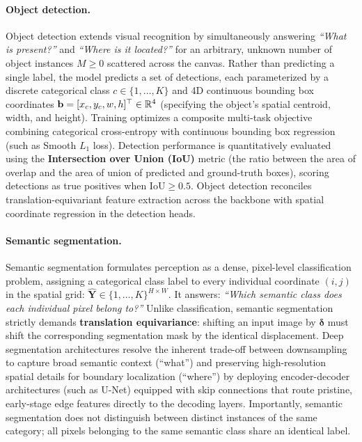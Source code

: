 \paragraph{Object detection.}
Object detection extends visual recognition by simultaneously answering \textit{``What is present?''} and \textit{``Where is it located?''} for an arbitrary, unknown number of object instances $M \ge 0$ scattered across the canvas. Rather than predicting a single label, the model predicts a set of detections, each parameterized by a discrete categorical class $c \in \{1, \dots, K\}$ and 4D continuous bounding box coordinates $\mathbf{b} = [x_c, y_c, w, h]^\top \in \mathbb{R}^4$ (specifying the object's spatial centroid, width, and height). Training optimizes a composite multi-task objective combining categorical cross-entropy with continuous bounding box regression (such as Smooth $L_1$ loss). Detection performance is quantitatively evaluated using the \textbf{Intersection over Union (IoU)} metric (the ratio between the area of overlap and the area of union of predicted and ground-truth boxes), scoring detections as true positives when $\text{IoU} \ge 0.5$. Object detection reconciles translation-equivariant feature extraction across the backbone with spatial coordinate regression in the detection heads.

\paragraph{Semantic segmentation.}
Semantic segmentation formulates perception as a dense, pixel-level classification problem, assigning a categorical class label to every individual coordinate $(i, j)$ in the spatial grid: $\hat{\mathbf{Y}} \in \{1, \dots, K\}^{H \times W}$. It answers: \textit{``Which semantic class does each individual pixel belong to?''} Unlike classification, semantic segmentation strictly demands \textbf{translation equivariance}: shifting an input image by $\boldsymbol{\delta}$ must shift the corresponding segmentation mask by the identical displacement. Deep segmentation architectures resolve the inherent trade-off between downsampling to capture broad semantic context (``what'') and preserving high-resolution spatial details for boundary localization (``where'') by deploying encoder-decoder architectures (such as U-Net) equipped with skip connections that route pristine, early-stage edge features directly to the decoding layers. Importantly, semantic segmentation does not distinguish between distinct instances of the same category; all pixels belonging to the same semantic class share an identical label.

